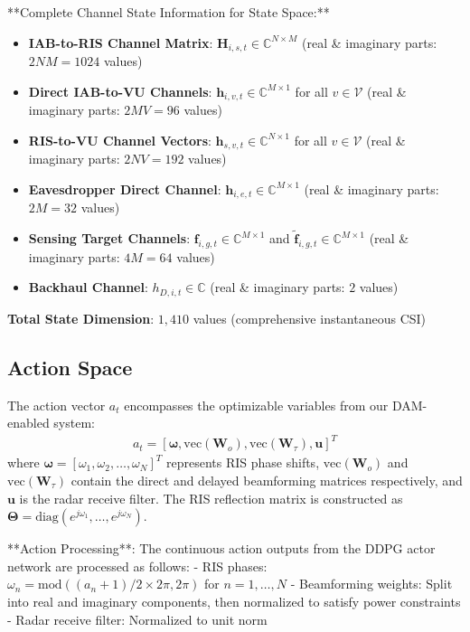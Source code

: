 \documentclass[journal]{IEEEtran}
\begin{document}
**Complete Channel State Information for State Space:**
\begin{itemize}
\item \textbf{IAB-to-RIS Channel Matrix}: $\mathbf{H}_{i,s,t} \in \mathbb{C}^{N \times M}$ (real \& imaginary parts: $2NM = 1024$ values)  
\item \textbf{Direct IAB-to-VU Channels}: $\mathbf{h}_{i,v,t} \in \mathbb{C}^{M \times 1}$ for all $v \in \mathcal{V}$ (real \& imaginary parts: $2MV = 96$ values)
\item \textbf{RIS-to-VU Channel Vectors}: $\mathbf{h}_{s,v,t} \in \mathbb{C}^{N \times 1}$ for all $v \in \mathcal{V}$ (real \& imaginary parts: $2NV = 192$ values)
\item \textbf{Eavesdropper Direct Channel}: $\mathbf{h}_{i,e,t} \in \mathbb{C}^{M \times 1}$ (real \& imaginary parts: $2M = 32$ values)
\item \textbf{Sensing Target Channels}: $\mathbf{f}_{i,g,t} \in \mathbb{C}^{M \times 1}$ and $\tilde{\mathbf{f}}_{i,g,t} \in \mathbb{C}^{M \times 1}$ (real \& imaginary parts: $4M = 64$ values)
\item \textbf{Backhaul Channel}: $h_{D,i,t} \in \mathbb{C}$ (real \& imaginary parts: $2$ values)
\end{itemize}
\textbf{Total State Dimension}: $1,410$ values (comprehensive instantaneous CSI)

\subsection{Action Space}

The action vector $a_t$ encompasses the optimizable variables from our DAM-enabled system:
\begin{align}
a_t = [\boldsymbol{\omega}, \text{vec}(\mathbf{W}_{o}), \text{vec}(\mathbf{W}_{\tau}), \mathbf{u}]^T
\end{align}
where $\boldsymbol{\omega} = [\omega_1, \omega_2, \ldots, \omega_N]^T$ represents RIS phase shifts, $\text{vec}(\mathbf{W}_{o})$ and $\text{vec}(\mathbf{W}_{\tau})$ contain the direct and delayed beamforming matrices respectively, and $\mathbf{u}$ is the radar receive filter. The RIS reflection matrix is constructed as $\boldsymbol{\Theta} = \text{diag}(e^{j\omega_1}, \ldots, e^{j\omega_N})$.

**Action Processing**: The continuous action outputs from the DDPG actor network are processed as follows:
- RIS phases: $\omega_n = \text{mod}((a_n + 1)/2 \times 2\pi, 2\pi)$ for $n = 1, \ldots, N$
- Beamforming weights: Split into real and imaginary components, then normalized to satisfy power constraints
- Radar receive filter: Normalized to unit norm
\end{document}
